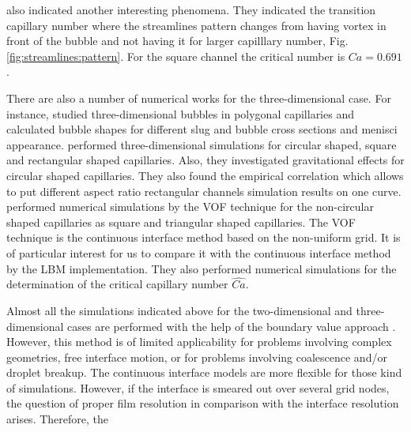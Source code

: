 \documentclass{CFD2011}
\begin{document}
\begin{description}
\citet{heil-threedim} also indicated another interesting phenomena. They indicated the transition
capillary number where the streamlines pattern
changes from having vortex in front of the bubble and not having it for larger capilllary number,
Fig. \ref{fig:streamlines:pattern}.
For the square channel the critical number is $Ca=0.691$.   

There are also a number of numerical works for the three-dimensional case. For instance, 
\citet{wong-films,wong-pressure} studied
three-dimensional bubbles in
polygonal capillaries and calculated bubble shapes for different
slug and bubble cross sections and menisci appearance.
\citet{heil-threedim} performed three-dimensional simulations for circular shaped,
square and rectangular shaped capillaries. Also, they investigated gravitational effects for
circular shaped capillaries. They also found the empirical correlation which allows to put
different  aspect ratio rectangular channels simulation results on one
curve. \citet{wang-non-circular} performed numerical simulations by the VOF technique for the
non-circular
shaped capillaries as square and triangular shaped capillaries. The VOF technique is the continuous
interface method based on the non-uniform grid. It is of particular interest for us to compare it
with the continuous interface method by the LBM implementation. 
They also performed
numerical simulations for the determination of the critical capillary number $\hat{Ca}$.
\end{description}
Almost all the simulations indicated above for the two-dimensional and three-dimensional cases
are performed with the help of the boundary value approach
\cite{ingham-plates,heil-bretherton,heil-threedim}. However, this method is of limited
applicability for
problems
involving complex geometries, free interface motion, or for problems involving coalescence and/or
droplet breakup. The continuous interface models are more flexible for those kind of simulations.
However, if the interface is smeared out over several grid nodes, the question of
proper film resolution in comparison with the interface resolution arises.  Therefore, the
\end{document}

